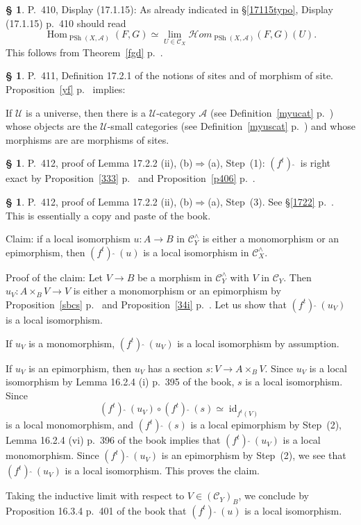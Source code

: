 \documentclass[12pt]{article}
\theoremstyle{remark}
\theoremstyle{definition}
\newtheorem{s}[thm]{\S}
\newcommand{\cc}{\mathcal}
\newcommand{\oo}{\operatorname}
\newcommand{\A}{\mathcal A}
\newcommand{\C}{\mathcal C}
\newcommand{\U}{\mathcal U}
\newcommand{\fthat}{(f^t)\ \widehat{}\ }
\newcommand{\then}{\Rightarrow}
\DeclareMathOperator{\id}{id}
\DeclareMathOperator{\Hom}{Hom}
\begin{document}
%

\begin{s}\label{17115ps}
P.~410, Display (17.1.15): As already indicated in \S\ref{17115typo}, Display (17.1.15) p.~410 should read 
$$
\Hom_{\oo{PSh}(X,\A)}(F,G)\simeq\lim_{U\in\C_X}\cc Hom_{\oo{PSh}(X,\A)}(F,G)(U).
$$
This follows from Theorem~\ref{fgd} p.~\pageref{fgd}. %
\end{s} 

%

\begin{s}
P.~411, Definition 17.2.1 of the notions of sites and of morphism of site. Proposition~\ref{yf} p.~\pageref{yf} implies:

If $\U$ is a universe, then there is a $\U$-category $\A$ (see Definition~\ref{myucat} p.~\pageref{myucat}) whose objects are the $\U$-small categories (see Definition~\ref{myuscat} p.~\pageref{myuscat}) and whose morphisms are are morphisms of sites.
\end{s}

%

\begin{s}
P.~412, proof of Lemma 17.2.2 (ii), (b)$\then$(a), Step~(1): $\fthat$ is right exact by Proposition~\ref{333} p.~\pageref{333} and Proposition~\ref{p406} p.~\pageref{p406}.
\end{s}

%

\begin{s}
P.~412, proof of Lemma 17.2.2 (ii), (b)$\then$(a), Step~(3). See \S\ref{1722} p.~\pageref{1722}. This is essentially a copy and paste of the book.

Claim: if a local isomorphism $u:A\to B$ in $\C_Y^\wedge$ is either a monomorphism or an epimorphism, then $\fthat(u)$ is a local isomorphism in $\C_X^\wedge$. 

Proof of the claim: Let $V\to B$ be a morphism in $\C_Y^\wedge$ with $V$ in $\C_Y$. Then $u_V: A\times_BV\to V$ is either a monomorphism or an epimorphism by Proposition~\ref{sbcs} p.~\pageref{sbcs} and Proposition~\ref{34i} p.~\pageref{34i}. Let us show that $\fthat(u_V)$ is a local isomorphism. 

If $u_V$ is a monomorphism, $\fthat(u_V)$ is a local isomorphism by assumption. 

If $u_V$ is an epimorphism, then $u_V$ has a section $s:V\to A\times_BV$. Since $u_V$ is a local isomorphism by Lemma 16.2.4 (i) p.~395 of the book, $s$ is a local isomorphism. Since 
$$
\fthat(u_V)\circ\fthat(s)\simeq\id_{f^t(V)}
$$ 
is a local monomorphism, and $\fthat(s)$ is a local epimorphism by Step~(2), Lemma 16.2.4 (vi) p.~396 of the book implies that $\fthat(u_V)$ is a local monomorphism. Since $\fthat(u_V)$ is an epimorphism by Step~(2), we see that $\fthat(u_V)$ is a local isomorphism. This proves the claim.

Taking the inductive limit with respect to $V\in(\C_Y)_B$, we conclude by Proposition 16.3.4 p.~401 of the book that $\fthat(u)$ is a local isomorphism.
\end{s}
\end{document}
